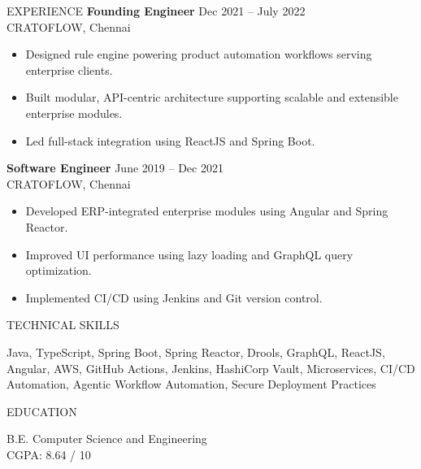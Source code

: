 \documentclass{resume}
\begin{document}
\begin{rSection}{EXPERIENCE}
\textbf{Founding Engineer} \hfill Dec 2021 – July 2022 \\
CRATOFLOW, Chennai
\begin{itemize}
\itemsep -3pt {}
\item Designed rule engine powering product automation workflows serving enterprise clients.
\item Built modular, API-centric architecture supporting scalable and extensible enterprise modules.
\item Led full-stack integration using ReactJS and Spring Boot.
\end{itemize}

\textbf{Software Engineer} \hfill June 2019 – Dec 2021 \\
CRATOFLOW, Chennai
\begin{itemize}
\itemsep -3pt {}
\item Developed ERP-integrated enterprise modules using Angular and Spring Reactor.
\item Improved UI performance using lazy loading and GraphQL query optimization.
\item Implemented CI/CD using Jenkins and Git version control.
\end{itemize}

\end{rSection}

\begin{rSection}{TECHNICAL SKILLS}

Java, TypeScript, Spring Boot, Spring Reactor, Drools, GraphQL, ReactJS, Angular, AWS, GitHub Actions, Jenkins, HashiCorp Vault, Microservices, CI/CD Automation, Agentic Workflow Automation, Secure Deployment Practices

\end{rSection}

\begin{rSection}{EDUCATION}

B.E. Computer Science and Engineering \\
CGPA: 8.64 / 10

\end{rSection}
\end{document}
